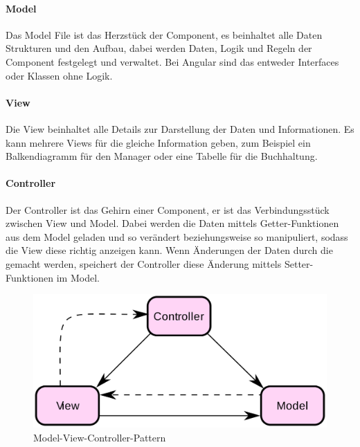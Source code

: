 \paragraph{Model}
Das Model File ist das Herzstück der Component, es beinhaltet alle Daten
Strukturen und den Aufbau, dabei werden Daten, Logik und Regeln
der Component festgelegt und verwaltet.
Bei Angular sind das entweder Interfaces oder Klassen ohne Logik.
~\cite{angular-design-patterns}

\paragraph{View}
Die View beinhaltet alle Details zur Darstellung der Daten und Informationen.
Es kann mehrere Views für die gleiche Information geben, zum Beispiel ein
Balkendiagramm für den Manager oder eine Tabelle für die Buchhaltung.

\paragraph{Controller}
Der Controller ist das Gehirn einer Component, er ist das Verbindungsstück zwischen View und Model.
Dabei werden die Daten mittels Getter-Funktionen aus dem Model geladen und so verändert beziehungsweise so manipuliert, sodass die View diese richtig
anzeigen kann.
Wenn Änderungen der Daten durch die gemacht werden, speichert der Controller diese Änderung mittels Setter-Funktionen im Model.

\begin{figure}
    \centering
    \includegraphics[scale=0.1]{pics/mvc_design_pattern}
    \caption{Model-View-Controller-Pattern}
    \label{fig:mvc_design_pattern}
\end{figure}